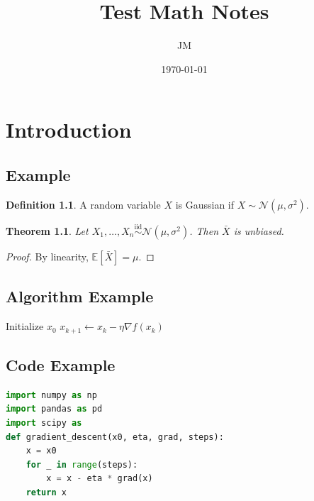 \documentclass[12pt,oneside]{book}
\title{Test Math Notes}
\author{JM}
\date{\today}
\numberwithin{equation}{section}
\theoremstyle{definition}
\newtheorem{definition}{Definition}[section]
\theoremstyle{plain}
\newtheorem{theorem}{Theorem}[section]
\theoremstyle{remark}
\newcommand{\E}{\mathbb{E}}
\newcommand{\iid}{\overset{\text{iid}}{\sim}}
\newcommand{\grad}{\nabla}
\newcommand{\Normal}{\mathcal{N}}
\begin{document}
\maketitle
\tableofcontents

\chapter{Introduction}

\section{Example}

\begin{definition}
A random variable $X$ is Gaussian if $X \sim \Normal(\mu,\sigma^2)$.
\end{definition}

\begin{theorem}
Let $X_1,\dots,X_n \iid \Normal(\mu,\sigma^2)$. Then $\bar X$ is unbiased.
\end{theorem}

\begin{proof}
By linearity,
$
\E[\bar X]
=
\mu.
$
\end{proof}

\section{Algorithm Example}

\begin{algorithm}
\caption{Gradient Descent}
\begin{algorithmic}[1]
\State Initialize $x_0$
    \State $x_{k+1} \gets x_k - \eta \grad f(x_k)$
\EndFor
\end{algorithmic}
\end{algorithm}

\section{Code Example}

\begin{lstlisting}[language=Python]
import numpy as np
import pandas as pd
import scipy as 
def gradient_descent(x0, eta, grad, steps):
    x = x0
    for _ in range(steps):
        x = x - eta * grad(x)
    return x
\end{lstlisting}
\end{document}

